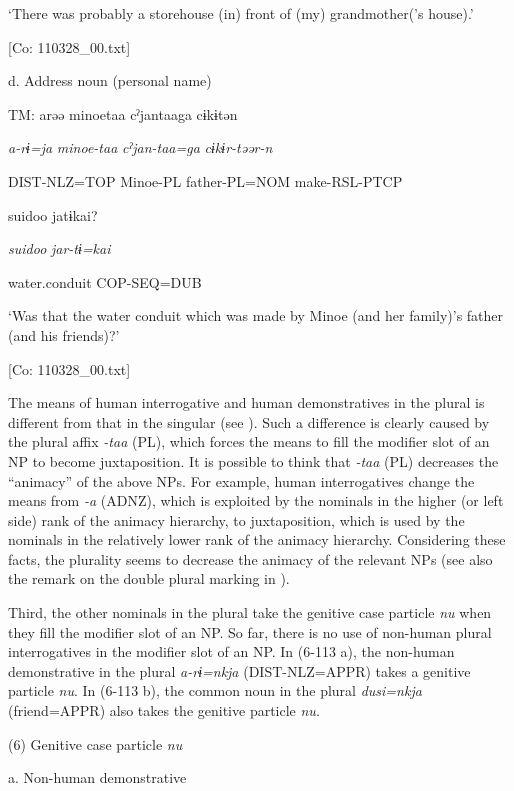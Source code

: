       ‘There was probably a storehouse (in) front of (my) grandmother(’s house).’

      [Co: 110328\_00.txt]

  d.  Address noun (personal name)

    TM:  arəə  minoetaa  cˀjantaaga  cɨkɨtən

      \textit{a-rɨ=ja}  \textit{minoe-taa}  \textit{cˀjan-taa=ga}  \textit{cɨkɨr-təər-n}

      DIST-NLZ=TOP  Minoe-PL  father-PL=NOM  make-RSL-PTCP

      {\textbar}suidoo{\textbar}  jatɨkai?

      \textit{suidoo}  \textit{jar-tɨ=kai}

      water.conduit  COP-SEQ=DUB

      ‘Was that the water conduit which was made by Minoe (and her family)’s father (and his friends)?’

      [Co: 110328\_00.txt]

The means of human interrogative and human demonstratives in the plural is different from that in the singular (see ). Such a difference is clearly caused by the plural affix \textit{{}-taa} (PL), which forces the means to fill the modifier slot of an NP to become juxtaposition. It is possible to think that \textit{{}-taa} (PL) decreases the “animacy” of the above NPs. For example, human interrogatives change the means from \textit{{}-a} (ADNZ), which is exploited by the nominals in the higher (or left side) rank of the animacy hierarchy, to juxtaposition, which is used by the nominals in the relatively lower rank of the animacy hierarchy. Considering these facts, the plurality seems to decrease the animacy of the relevant NPs (see also the remark on the double plural marking in ).

  Third, the other nominals in the plural take the genitive case particle \textit{nu} when they fill the modifier slot of an NP. So far, there is no use of non-human plural interrogatives in the modifier slot of an NP. In (6-113 a), the non-human demonstrative in the plural \textit{a-rɨ=nkja} (DIST-NLZ=APPR) takes a genitive particle \textit{nu}. In (6-113 b), the common noun in the plural \textit{dusi=nkja} (friend=APPR) also takes the genitive particle \textit{nu}.

(6)  Genitive case particle \textit{nu}

  a.  Non-human demonstrative


